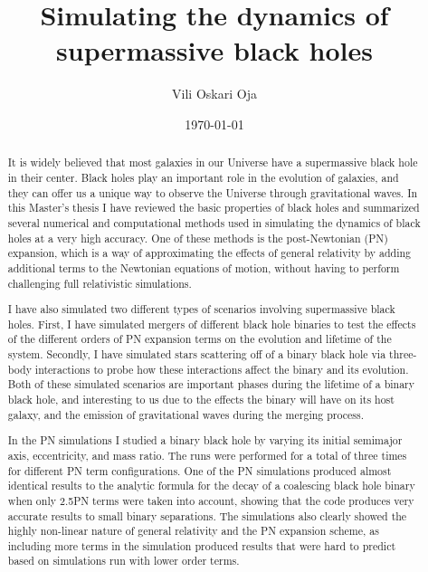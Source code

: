 \documentclass[english, oneside]{HYgradu}
\title{Simulating the dynamics of supermassive black holes}
\author{Vili Oskari Oja}
\date{\today}
\begin{document}
\setlength{\parindent}{1cm}
\setlength{\parskip}{0cm}
\maketitle

\begin{abstract}
It is widely believed that most galaxies in our Universe have a supermassive black hole in their center. Black holes play an important role in the evolution of galaxies, and they can offer us a unique way to observe the Universe through gravitational waves. In this Master's thesis I have reviewed the basic properties of black holes and summarized several numerical and computational methods used in simulating the dynamics of black holes at a very high accuracy. One of these methods is the post-Newtonian (PN) expansion, which is a way of approximating the effects of general relativity by adding additional terms to the Newtonian equations of motion, without having to perform challenging full relativistic simulations.

I have also simulated two different types of scenarios involving supermassive black holes. First, I have simulated mergers of different black hole binaries to test the effects of the different orders of PN expansion terms on the evolution and lifetime of the system. Secondly, I have simulated stars scattering off of a binary black hole via three-body interactions to probe how these interactions affect the binary and its evolution. Both of these simulated scenarios are important phases during the lifetime of a binary black hole, and interesting to us due to the effects the binary will have on its host galaxy, and the emission of gravitational waves during the merging process.

In the PN simulations I studied a binary black hole by varying its initial semimajor axis, eccentricity, and mass ratio. The runs were performed for a total of three times for different PN term configurations. One of the PN simulations produced almost identical results to the analytic formula for the decay of a coalescing black hole binary when only 2.5PN terms were taken into account, showing that the code produces very accurate results to small binary separations. The simulations also clearly showed the highly non-linear nature of general relativity and the PN expansion scheme, as including more terms in the simulation produced results that were hard to predict based on simulations run with lower order terms. 


\end{abstract}
\end{document}
